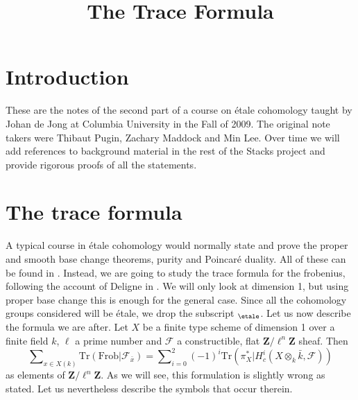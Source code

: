 

%


\title{The Trace Formula}


\maketitle

\label{section-phantom}

\tableofcontents


\section{Introduction}
\label{section-introduction}

\noindent
These are the notes of the second part of a course on \'etale cohomology
taught by Johan de Jong at Columbia University in the Fall of 2009. The
original note takers were Thibaut Pugin, Zachary Maddock and Min Lee.
Over time we will add references to background material in the rest of the
Stacks project and provide rigorous proofs of all the statements.









\section{The trace formula}
\label{section-trace-formula}

\noindent
A typical course in \'etale cohomology would normally state and prove the
proper and smooth base change theorems, purity and Poincar\'e duality. All of
these can be found in \cite[Arcata]{SGA4.5}. Instead, we are going to study the
trace formula for the frobenius, following the account of Deligne in
\cite[Rapport]{SGA4.5}. We will only look at dimension 1, but using proper base
change this is enough for the general case. Since all the cohomology groups
considered will be \'etale, we drop the subscript $_\etale$. Let us
now describe
the formula we are after. Let $X$ be a finite type scheme of dimension 1 over a
finite field $k$, $\ell$ a prime number and $\mathcal{F}$ a constructible, flat
$\mathbf{Z}/\ell^n\mathbf{Z}$ sheaf. Then
\begin{equation}
\label{equation-trace-formula-initial}
\sum\nolimits_{x \in X(k)}
\text{Tr}(\text{Frob} | \mathcal{F}_{\bar x}) =
\sum\nolimits_{i = 0}^2
(-1)^i \text{Tr}(\pi_X^* | H^i_c(X \otimes_k \bar k, \mathcal{F}))
\end{equation}
as elements of $\mathbf{Z}/\ell^n\mathbf{Z}$. As we will see, this formulation
is slightly wrong as stated. Let us nevertheless describe the symbols that
occur therein.




